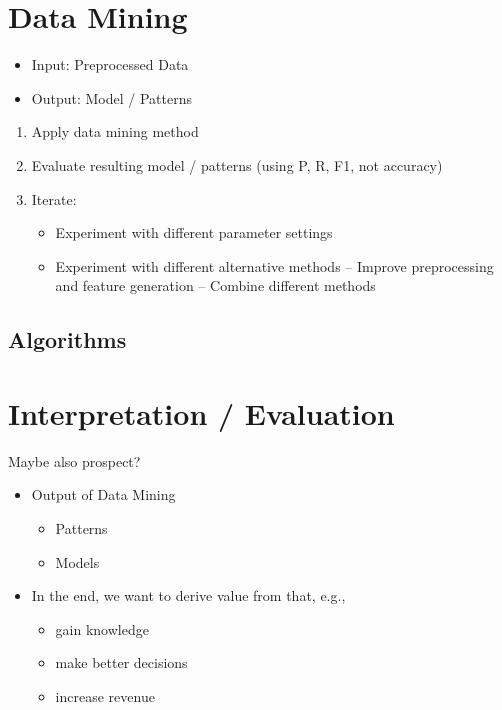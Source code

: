 \chapter{Data Mining}
\label{cha:data_mining}
\begin{itemize}
	\item Input: Preprocessed Data
	\item Output: Model / Patterns
\end{itemize}

\begin{enumerate}
	\item Apply data mining method
	\item Evaluate resulting model / patterns (using P, R, F1, not accuracy)
	\item Iterate:
	\begin{itemize}
		\item Experiment with different parameter settings
		\item Experiment with different alternative methods – Improve preprocessing and feature generation – Combine different methods
	\end{itemize}
\end{enumerate}

\section{Algorithms}



\chapter{Interpretation / Evaluation}
\label{cha:interpretation_evaluation}
Maybe also prospect?
\begin{itemize}
	\item Output of Data Mining
	\begin{itemize}
		\item Patterns
		\item Models
	\end{itemize}
	\item In the end, we want to derive value from that, e.g.,
	\begin{itemize}
		\item gain knowledge
		\item make better decisions
		\item increase revenue
	\end{itemize}
\end{itemize}



